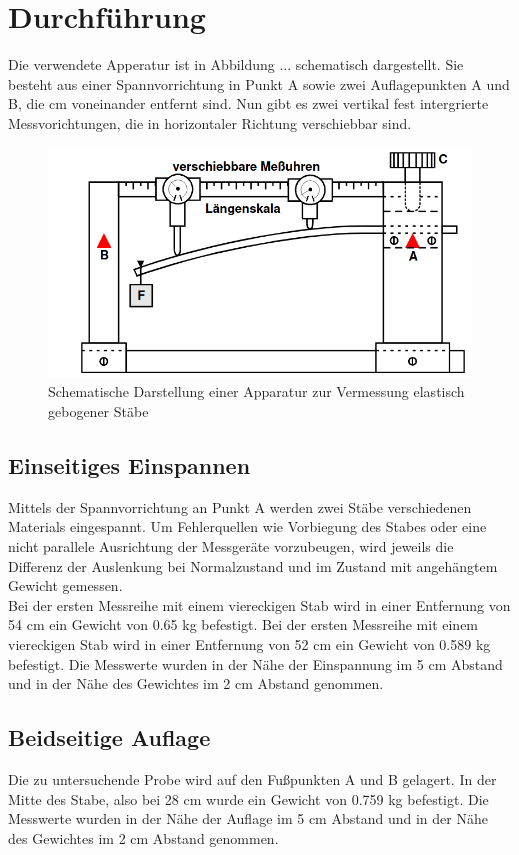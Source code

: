 \section{Durchführung}
\label{sec:Durchführung}

Die verwendete Apperatur ist in Abbildung ... schematisch dargestellt. Sie besteht aus 
einer Spannvorrichtung in Punkt A sowie zwei Auflagepunkten A und B, die %
cm voneinander entfernt sind.
Nun gibt es zwei vertikal fest intergrierte Messvorichtungen, die in horizontaler Richtung 
verschiebbar sind.
\begin{figure}
    \centering
    \includegraphics[scale=0.5]{panierte Austern.png}
    \caption{Schematische Darstellung einer Apparatur zur Vermessung elastisch gebogener Stäbe}
    \label{fig:backfisch}
\end{figure}

\subsection{Einseitiges Einspannen}
    Mittels der Spannvorrichtung an Punkt A werden zwei Stäbe verschiedenen Materials
    eingespannt. Um Fehlerquellen wie Vorbiegung des Stabes oder eine nicht parallele
    Ausrichtung der Messgeräte vorzubeugen, wird jeweils die Differenz der Auslenkung
    bei Normalzustand und im Zustand mit angehängtem Gewicht gemessen.\\
    Bei der ersten Messreihe mit einem viereckigen Stab wird in einer Entfernung von 54
    cm ein Gewicht von 0.65 kg befestigt.
    Bei der ersten Messreihe mit einem viereckigen Stab wird in einer Entfernung von 52
    cm ein Gewicht von 0.589 kg befestigt.
    Die Messwerte wurden in der Nähe der Einspannung im 5 cm Abstand und in der Nähe
    des Gewichtes im 2 cm Abstand genommen.


\subsection{Beidseitige Auflage}
    Die zu untersuchende Probe wird auf den Fußpunkten A und B gelagert. In der Mitte
    des Stabe, also bei 28 cm wurde ein Gewicht von 0.759 kg befestigt.
    Die Messwerte wurden in der Nähe der Auflage im 5 cm Abstand und in der Nähe
    des Gewichtes im 2 cm Abstand genommen.